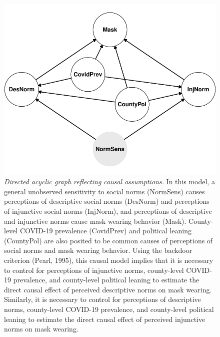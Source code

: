 \documentclass[
  english,
  man,floatsintext]{apa6}
\begin{document}
\newpage



\begin{figure}
\centering
\includegraphics{manuscript_files/figure-latex/plotDAG-1.pdf}
\caption{\label{fig:plotDAG}\emph{Directed acyclic graph reflecting causal assumptions.} In this model, a general unobserved sensitivity to social norms (NormSens) causes perceptions of descriptive social norms (DesNorm) and perceptions of injunctive social norms (InjNorm), and perceptions of descriptive and injunctive norms cause mask wearing behavior (Mask). County-level COVID-19 prevalence (CovidPrev) and political leaning (CountyPol) are also posited to be common causes of perceptions of social norms and mask wearing behavior. Using the backdoor criterion (Pearl, 1995), this causal model implies that it is necessary to control for perceptions of injunctive norms, county-level COVID-19 prevalence, and county-level political leaning to estimate the direct causal effect of perceived descriptive norms on mask wearing. Similarly, it is necessary to control for perceptions of descriptive norms, county-level COVID-19 prevalence, and county-level political leaning to estimate the direct causal effect of perceived injunctive norms on mask wearing.}
\end{figure}

\newpage
\end{document}
